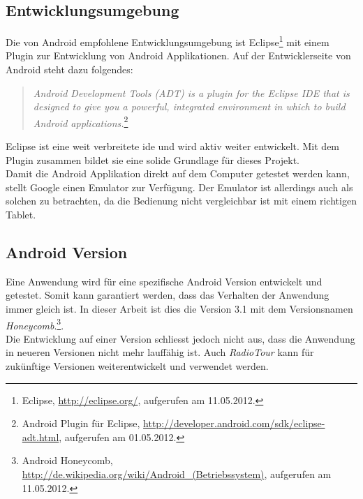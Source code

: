 \subsection{Entwicklungsumgebung}
Die von Android empfohlene Entwicklungsumgebung ist Eclipse\footnote{Eclipse, \url{http://eclipse.org/}, aufgerufen am 11.05.2012.} mit einem Plugin zur Entwicklung von Android Applikationen. Auf der Entwicklerseite von Android steht dazu folgendes:
\begin{quote}
\textit{Android Development Tools (ADT) is a plugin for the Eclipse IDE that is designed to give you a powerful, integrated environment in which to build Android applications.}\footnote{Android Plugin für Eclipse, \url{http://developer.android.com/sdk/eclipse-adt.html}, aufgerufen am 01.05.2012.}
\end{quote}
Eclipse ist eine weit verbreitete \gls{ide} und wird aktiv weiter entwickelt. Mit dem Plugin zusammen bildet sie eine solide Grundlage für dieses Projekt.
\\
Damit die Android Applikation direkt auf dem Computer getestet werden kann, stellt Google einen Emulator zur Verfügung. Der Emulator ist allerdings auch als solchen zu betrachten, da die Bedienung nicht vergleichbar ist mit einem richtigen Tablet.

\subsection{Android Version}
Eine Anwendung wird für eine spezifische Android Version entwickelt und getestet. Somit kann garantiert werden, dass das Verhalten der Anwendung  immer gleich ist. In dieser Arbeit ist dies die Version 3.1 mit dem Versionsnamen \textit{Honeycomb}.\footnote{Android Honeycomb, \url{http://de.wikipedia.org/wiki/Android_(Betriebssystem)}, aufgerufen am 11.05.2012.}.
\\
Die Entwicklung auf einer Version schliesst jedoch nicht aus, dass die Anwendung in neueren Versionen nicht mehr lauffähig ist. Auch \textit{RadioTour} kann für zukünftige Versionen weiterentwickelt und verwendet werden.

